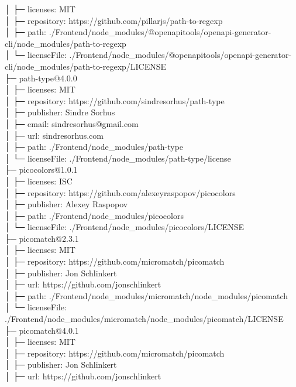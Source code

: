 │  ├─ licenses: MIT\\
│  ├─ repository: https://github.com/pillarjs/path-to-regexp\\
│  ├─ path: ./Frontend/node\_modules/@openapitools/openapi-generator-cli/node\_modules/path-to-regexp\\
│  └─ licenseFile: ./Frontend/node\_modules/@openapitools/openapi-generator-cli/node\_modules/path-to-regexp/LICENSE\\
├─ path-type@4.0.0\\
│  ├─ licenses: MIT\\
│  ├─ repository: https://github.com/sindresorhus/path-type\\
│  ├─ publisher: Sindre Sorhus\\
│  ├─ email: sindresorhus@gmail.com\\
│  ├─ url: sindresorhus.com\\
│  ├─ path: ./Frontend/node\_modules/path-type\\
│  └─ licenseFile: ./Frontend/node\_modules/path-type/license\\
├─ picocolors@1.0.1\\
│  ├─ licenses: ISC\\
│  ├─ repository: https://github.com/alexeyraspopov/picocolors\\
│  ├─ publisher: Alexey Raspopov\\
│  ├─ path: ./Frontend/node\_modules/picocolors\\
│  └─ licenseFile: ./Frontend/node\_modules/picocolors/LICENSE\\
├─ picomatch@2.3.1\\
│  ├─ licenses: MIT\\
│  ├─ repository: https://github.com/micromatch/picomatch\\
│  ├─ publisher: Jon Schlinkert\\
│  ├─ url: https://github.com/jonschlinkert\\
│  ├─ path: ./Frontend/node\_modules/micromatch/node\_modules/picomatch\\
│  └─ licenseFile: ./Frontend/node\_modules/micromatch/node\_modules/picomatch/LICENSE\\
├─ picomatch@4.0.1\\
│  ├─ licenses: MIT\\
│  ├─ repository: https://github.com/micromatch/picomatch\\
│  ├─ publisher: Jon Schlinkert\\
│  ├─ url: https://github.com/jonschlinkert\\
